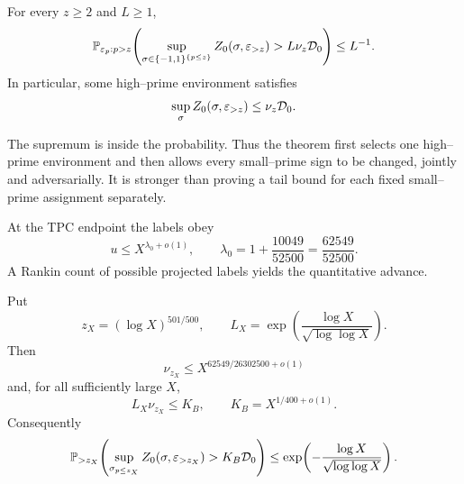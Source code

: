 \begin{theorem}
\label{thm:tpc44-intro-robust-face}
For every \(z\ge2\) and \(L\ge1\),
\begin{equation}
 \mathbb P_{\varepsilon_p:p>z}\!\left(
  \sup_{\sigma\in\{-1,1\}^{\{p\le z\}}}
  Z_0(\sigma,\varepsilon_{>z})
  >L\nu_z\mathcal D_0
 \right)
 \le L^{-1}.
 \label{eq:tpc44-intro-face-probability}
\end{equation}
In particular, some high--prime environment satisfies
\begin{equation}
 \sup_{\sigma}Z_0(\sigma,\varepsilon_{>z})\le\nu_z\mathcal D_0.
 \label{eq:tpc44-intro-face-existence}
\end{equation}
\end{theorem}

The supremum is inside the probability.  Thus the theorem first selects
one high--prime environment and then allows every small--prime sign to be
changed, jointly and adversarially.  It is stronger than proving a tail
bound for each fixed small--prime assignment separately.

At the TPC endpoint the labels obey
\begin{equation}
 u\le X^{\lambda_0+o(1)},
 \qquad
 \lambda_0=1+\frac{10049}{52500}
 =\frac{62549}{52500}.
 \label{eq:tpc44-intro-lambda}
\end{equation}
A Rankin count of possible projected labels yields the quantitative
advance.

\begin{theorem}
\label{thm:tpc44-intro-quantitative-face}
Put
\begin{equation}
 z_X=(\log X)^{501/500},
 \qquad
 L_X=\exp\!\left(\frac{\log X}{\sqrt{\log\log X}}\right).
 \label{eq:tpc44-intro-z-L}
\end{equation}
Then
\begin{equation}
 \nu_{z_X}
 \le X^{62549/26302500+o(1)}
 \label{eq:tpc44-intro-nu-bound}
\end{equation}
and, for all sufficiently large \(X\),
\begin{equation}
 L_X\nu_{z_X}\le K_B,
 \qquad K_B=X^{1/400+o(1)}.
 \label{eq:tpc44-intro-budget}
\end{equation}
Consequently
\begin{equation}
 \mathbb P_{>z_X}\!\left(
  \sup_{\sigma_{p\le z_X}}
  Z_0(\sigma,\varepsilon_{>z_X})
  >K_B\mathcal D_0
 \right)
 \le
 \exp\!\left(-\frac{\log X}{\sqrt{\log\log X}}\right).
 \label{eq:tpc44-intro-quantitative-probability}
\end{equation}
\end{theorem}

